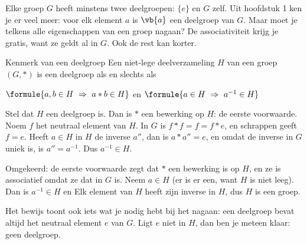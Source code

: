 Elke groep $G$ heeft minstens twee deelgroepen: $\{e\}$ en $G$ zelf. Uit hoofdstuk 1 ken je er veel meer: voor elk element $a$ is $\vb{a}$ een deelgroep van $G$. Maar moet je telkens alle eigenschappen van een groep nagaan? De associativiteit krijg je gratis, want ze geldt al in $G$. Ook de rest kan korter.

\begin{theorie}
\begin{stelling}{Kenmerk van een deelgroep}
Een niet-lege deelverzameling $H$ van een groep $(G, \ast)$ is een deelgroep als en slechts als

\vspace{1mm}
\qquad $\formule{a, b \in H \ \Rightarrow \ a \ast b \in H}$ \qquad en \qquad $\formule{a \in H \ \Rightarrow \ a^{-1} \in H}$
\end{stelling}

\begin{bewijs}
Stel dat $H$ een deelgroep is. Dan is $\ast$ een bewerking op $H$: de eerste voorwaarde. Noem $f$ het neutraal element van $H$. In $G$ is $f \ast f = f = f \ast e$, en schrappen geeft $f = e$. Heeft $a \in H$ in $H$ de inverse $a''$, dan is $a \ast a'' = e$, en omdat de inverse in $G$ uniek is, is $a'' = a^{-1}$. Dus $a^{-1} \in H$.

Omgekeerd: de eerste voorwaarde zegt dat $\ast$ een bewerking is op $H$, en ze is associatief omdat ze dat in $G$ is. Neem $a \in H$ (er is er een, want $H$ is niet leeg). Dan is $a^{-1} \in H$ en
Elk element van $H$ heeft zijn inverse in $H$, dus $H$ is een groep.
\end{bewijs}
\end{theorie}

Het bewijs toont ook iets wat je nodig hebt bij het nagaan: een deelgroep bevat altijd het neutraal element $e$ van $G$. Ligt $e$ niet in $H$, dan ben je meteen klaar: geen deelgroep.



